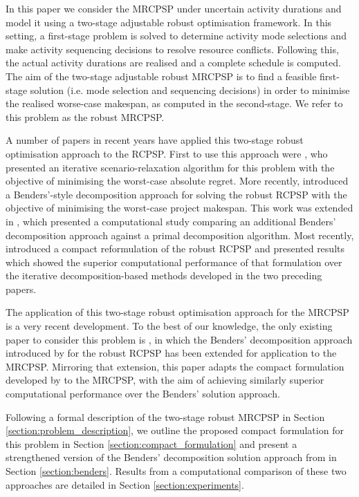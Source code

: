 \documentclass[a4paper,abstracton]{scrartcl}
\begin{document}
In this paper we consider the MRCPSP under uncertain activity durations and model it using a two-stage adjustable robust optimisation framework. In this setting, a first-stage problem is solved to determine activity mode selections and make activity sequencing decisions to resolve resource conflicts. Following this, the actual activity durations are realised and a complete schedule is computed. The aim of the two-stage adjustable robust MRCPSP is to find a feasible first-stage solution (i.e. mode selection and sequencing decisions) in order to minimise the realised worse-case makespan, as computed in the second-stage. We refer to this problem as the robust MRCPSP.

A number of papers in recent years have applied this two-stage robust optimisation approach to the RCPSP. First to use this approach were \cite{artigues2013robust}, who presented an iterative scenario-relaxation algorithm for this problem with the objective of minimising the worst-case absolute regret. More recently, \cite{bruni2017adjustable} introduced a Benders'-style decomposition approach for solving the robust RCPSP with the objective of minimising the worst-case project makespan. This work was extended in \cite{bruni2018computational}, which presented a computational study comparing an additional Benders' decomposition approach against a primal decomposition algorithm. Most recently, \cite{bold2021compact} introduced a compact reformulation of the robust RCPSP and presented results which showed the superior computational performance of that formulation over the iterative decomposition-based methods developed in the two preceding papers. 

The application of this two-stage robust optimisation approach for the MRCPSP is a very recent development. To the best of our knowledge, the only existing paper to consider this problem is \cite{balouka2021robust}, in which the Benders' decomposition approach introduced by \cite{bruni2017adjustable} for the robust RCPSP has been extended for application to the MRCPSP. Mirroring that extension, this paper adapts the compact formulation developed by \cite{bold2021compact} to the MRCPSP, with the aim of achieving similarly superior computational performance over the Benders' solution approach. 

Following a formal description of the two-stage robust MRCPSP in Section \ref{section:problem_description}, we outline the proposed compact formulation for this problem in Section \ref{section:compact_formulation} and present a strengthened version of the Benders' decomposition solution approach from \cite{balouka2021robust} in Section \ref{section:benders}. Results from a computational comparison of these two approaches are detailed in Section \ref{section:experiments}.
\end{document}
